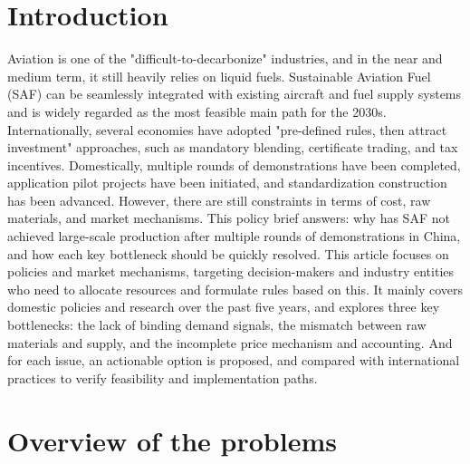 \documentclass[a4paper,11pt]{article}
\begin{document}
\section{Introduction}
Aviation is one of the "difficult-to-decarbonize" industries, and in the near and medium term, it still heavily relies on liquid fuels. Sustainable Aviation Fuel (SAF) can be seamlessly integrated with existing aircraft and fuel supply systems and is widely regarded as the most feasible main path for the 2030s. Internationally, several economies have adopted "pre-defined rules, then attract investment" approaches, such as mandatory blending, certificate trading, and tax incentives. Domestically, multiple rounds of demonstrations have been completed, application pilot projects have been initiated, and standardization construction has been advanced. However, there are still constraints in terms of cost, raw materials, and market mechanisms. This policy brief answers: why has SAF not achieved large-scale production after multiple rounds of demonstrations in China, and how each key bottleneck should be quickly resolved. This article focuses on policies and market mechanisms, targeting decision-makers and industry entities who need to allocate resources and formulate rules based on this. It mainly covers domestic policies and research over the past five years, and explores three key bottlenecks: the lack of binding demand signals, the mismatch between raw materials and supply, and the incomplete price mechanism and accounting. And for each issue, an actionable option is proposed, and compared with international practices to verify feasibility and implementation paths.


\section{Overview of the problems}
\end{document}
